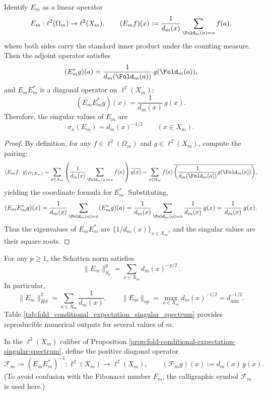 \begin{proposition}\label{prop:fold-conditional-expectation-singular-spectrum}
Identify $E_m$ as a linear operator
\[
E_m:\ell^2(\Omega_m)\to \ell^2(X_m),
\qquad
(E_m f)(x):=\frac{1}{d_m(x)}\sum_{\Fold_m(a)=x} f(a),
\]
where both sides carry the standard inner product under the counting measure. Then the adjoint operator satisfies
\[
(E_m^\ast g)(a)=\frac{1}{d_m(\Fold_m(a))}\,g(\Fold_m(a)),
\]
and \(E_mE_m^\ast\) is a diagonal operator on \(\ell^2(X_m)\):
\[
(E_mE_m^\ast g)(x)=\frac{1}{d_m(x)}\,g(x).
\]
Therefore, the singular values of \(E_m\) are
\[
\boxed{\ \sigma_x(E_m)=d_m(x)^{-1/2}\qquad(x\in X_m).\ }
\]
\end{proposition}
\begin{proof}
By definition, for any \(f\in\ell^2(\Omega_m)\) and \(g\in\ell^2(X_m)\), compute the pairing:
\[
\langle E_m f,\ g\rangle_{\ell^2(X_m)}
=\sum_{x\in X_m}\left(\frac{1}{d_m(x)}\sum_{\Fold_m(a)=x} f(a)\right)\overline{g(x)}
=\sum_{a\in\Omega_m} f(a)\,\overline{\left(\frac{1}{d_m(\Fold_m(a))}g(\Fold_m(a))\right)},
\]
yielding the coordinate formula for \(E_m^\ast\). Substituting,
\[
(E_mE_m^\ast g)(x)
=\frac{1}{d_m(x)}\sum_{\Fold_m(a)=x}(E_m^\ast g)(a)
=\frac{1}{d_m(x)}\sum_{\Fold_m(a)=x}\frac{1}{d_m(x)}\,g(x)
=\frac{1}{d_m(x)}\,g(x).
\]
Thus the eigenvalues of \(E_mE_m^\ast\) are \(\{1/d_m(x)\}_{x\in X_m}\), and the singular values are their square roots. \qedhere
\end{proof}

\begin{corollary}\label{cor:fold-conditional-expectation-schatten}
For any \(p\ge 1\), the Schatten norm satisfies
\[
\boxed{\ \|E_m\|_{S_p}^p=\sum_{x\in X_m} d_m(x)^{-p/2}\ }.
\]
In particular,
\[
\|E_m\|_{HS}^2=\sum_{x\in X_m}\frac{1}{d_m(x)},
\qquad
\|E_m\|_{op}=\max_{x\in X_m} d_m(x)^{-1/2}=d_{\min}^{-1/2}.
\]
Table \ref{tab:fold_conditional_expectation_singular_spectrum} provides reproducible numerical outputs for several values of \(m\).

\end{corollary}

\begin{definition}\label{def:fold-fiber-multiplicity-operator}
In the \(\ell^2(X_m)\) caliber of Proposition \ref{prop:fold-conditional-expectation-singular-spectrum}, define the positive diagonal operator
\[
\mathcal{F}_m:=(E_mE_m^\ast)^{-1}:\ell^2(X_m)\to\ell^2(X_m),
\qquad
(\mathcal{F}_m g)(x):=d_m(x)\,g(x).
\]
(To avoid confusion with the Fibonacci number \(F_m\), the calligraphic symbol \(\mathcal{F}_m\) is used here.)
\end{definition}

